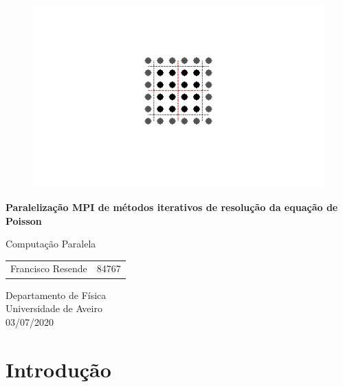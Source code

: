 \documentclass[10pt]{extarticle}
\begin{document}
\begin{titlepage}
	\begin{center}
		\begin{figure}[H]
			\centering
			\includegraphics[width=\linewidth]{model_code_parallelization.png}
		\end{figure}
		\vspace{3cm}
		\Large
		\textbf{Paralelização MPI de métodos iterativos de resolução da equação de Poisson}
		
		\normalsize
		\vspace{0.5cm}
		Computação Paralela
		
		\vspace{1.5cm}
		\begin{tabular}{lr}
			Francisco Resende & 84767 \\
		\end{tabular}
		
		\vfill
		
		Departamento de Física\\
		\vspace{0.1cm}
		Universidade de Aveiro\\
		\vspace{0.1cm}
		03/07/2020
	\end{center}
\end{titlepage}

\tableofcontents
\cleardoublepage

\cleardoublepage

\listoffigures
\cleardoublepage

\cleardoublepage


\section{Introdução} \label{sec:Intro}
	
\end{document}
